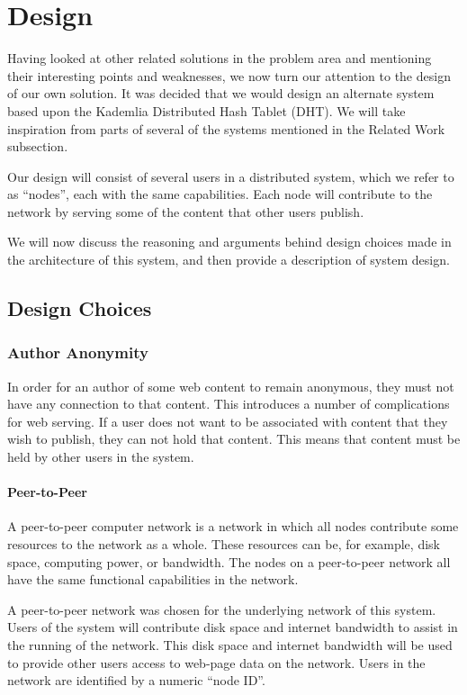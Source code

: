 \chapter{Design}

Having looked at other related solutions in the problem area and mentioning their
interesting points and weaknesses, we now turn our attention to the design of our own solution.
It was decided that we would design an alternate system based upon the Kademlia
Distributed Hash Tablet (DHT). We will take inspiration from parts of several of the systems
mentioned in the Related Work subsection.

Our design will consist of several users in a distributed system, which we refer to as “nodes”,
each with the same capabilities. Each node will contribute to the network by serving some of the
content that other users publish.

We will now discuss the reasoning and arguments behind design choices made in the architecture of this system,
and then provide a description of system design.

\section{Design Choices}

\subsection{Author Anonymity}

In order for an author of some web content to remain anonymous, they must not have any connection
to that content. This introduces a number of complications for web serving. If a user does not want
to be associated with content that they wish to publish, they can not hold that content. This means
that content must be held by other users in the system.

\subsubsection{Peer-to-Peer}
A peer-to-peer computer network is a network in which all nodes contribute some resources to the
network as a whole. These resources can be, for example, disk space, computing power, or bandwidth.
The nodes on a peer-to-peer network all have the same functional capabilities in the network.

A peer-to-peer network was chosen for the underlying network of this system. Users of the system will
contribute disk space and internet bandwidth to assist in the running of the network. This disk space and
internet bandwidth will be used to provide other users access to web-page data on the network. Users in
the network are identified by a numeric “node ID”.


